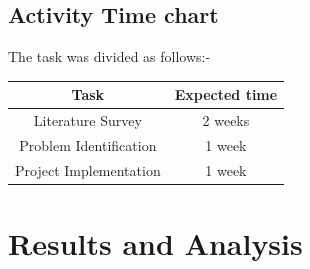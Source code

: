 \documentclass[10pt]{article}
\begin{document}
	\subsection{Activity Time chart}
		The task was divided as follows:-
		\begin{center}
			\begin{tabular} {|| c | c || }				
				\hline 
				\textbf{Task} & \textbf{Expected time} \\
				\hline
				Literature Survey & 2 weeks \\
				\hline 
				Problem Identification & 1 week \\
				\hline 
				Project Implementation & 1 week \\
				\hline 
				
			\end{tabular}
		\end{center}	
	\newpage
	\section{Results and Analysis}
\end{document}
